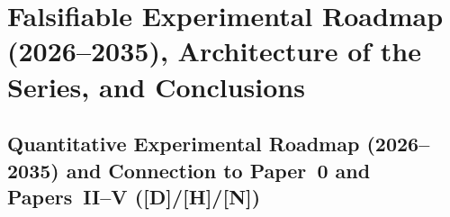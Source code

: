 \documentclass[11pt,a4paper]{article}
\newcommand{\catD}{\textbf{\textcolor{blue!75!black}{[D]}}}
\newcommand{\catH}{\textbf{\textcolor{orange!85!black}{[H]}}}
\newcommand{\catN}{\textbf{\textcolor{teal!75!black}{[N]}}}
\theoremstyle{definition}
\theoremstyle{remark}
\begin{document}
\section{\texorpdfstring{Falsifiable Experimental Roadmap (2026--2035), Architecture of the Series, and Conclusions}{Falsifiable Experimental Roadmap, Architecture of the Series, and Conclusions}}

\subsection{\texorpdfstring{Quantitative Experimental Roadmap (2026--2035) and Connection to Paper~0 and Papers~II--V (\catD/\catH/\catN)}{Quantitative Experimental Roadmap (2026-2035) and Connection to Paper 0 and Papers II-V}}
\end{document}
